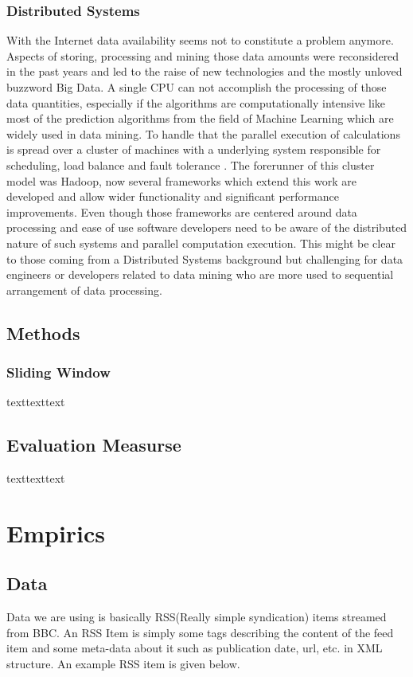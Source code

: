 \documentclass[12pt]{article}
\begin{document}
\subsubsection{Distributed Systems}
With the Internet data availability seems not to constitute a problem anymore. Aspects of storing, processing and mining those data amounts were reconsidered in the past years and led to the raise of new technologies and the mostly unloved buzzword Big Data. A single CPU can not accomplish the processing of those data quantities, especially if the algorithms are computationally intensive like most of the prediction algorithms from the field of Machine Learning which are widely used in data mining. To handle that  the parallel execution of calculations is spread over a cluster of machines with a underlying system responsible for scheduling, load balance and fault tolerance \citep[p. 10]{zaharia2010} . The forerunner of this cluster model was Hadoop, now several frameworks which extend this work are developed and allow wider functionality and significant performance improvements. Even though those frameworks are centered around data processing and ease of use software developers need to be aware of the distributed nature of such systems and parallel computation execution. This might be clear to those coming from a Distributed Systems background but challenging for data engineers or developers related to data mining who are more used to sequential arrangement of data processing.  

\subsection{Methods}
\subsubsection{Sliding Window}
texttexttext

\subsection{Evaluation Measurse}
texttexttext

\section{Empirics}
\subsection{Data}
Data we are using is basically RSS(Really simple syndication) items streamed from BBC. An RSS Item is simply some tags describing the content of the feed item and some meta-data about it such as publication date, url, etc. in XML structure. An example RSS item is given below.
\end{document}
